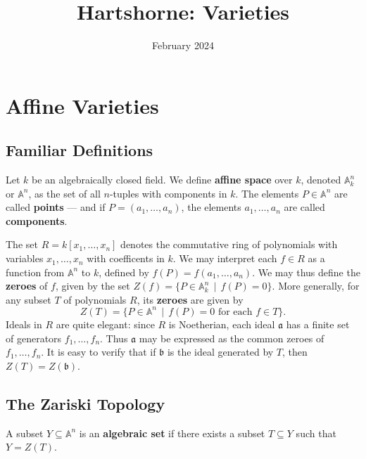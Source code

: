 \documentclass[11pt]{article}
\title{Hartshorne: Varieties}
\author{February 2024}
\begin{document}
\maketitle
\tableofcontents
\newpage


\section{Affine Varieties}


\subsection{Familiar Definitions}

Let $k$ be an algebraically closed field. We define \textbf{affine space} over $k$, denoted $\mathbb{A}_{k}^{n}$ or $\mathbb{A}^{n}$, as the set of all $n$-tuples with components in $k$. The elements $P \in \mathbb{A}^{n}$ are called \textbf{points} --- and if $P = (a_{1}, \ldots, a_{n})$, the elements $a_{1}, \ldots, a_{n}$ are called \textbf{components}.

The set $R = k[x_{1}, \ldots, x_{n}]$ denotes the commutative ring of polynomials with variables $x_{1}, \ldots, x_{n}$ with coefficents in $k$. We may interpret each $f \in R$ as a function from $\mathbb{A}^{n}$ to $k$, defined by $f(P) = f(a_{1}, \ldots, a_{n})$. We may thus define the \textbf{zeroes} of $f$, given by the set $Z(f) = \{ P \in \mathbb{A}_{k}^{n} \, \mid \, f(P) = 0 \}$. More generally, for any subset $T$ of polynomials $R$, its \textbf{zeroes} are given by
\[
  Z(T) = \{ P \in \mathbb{A}^{n} \, \mid \, f(P) = 0 \text{ for each } f \in T \}.
\]
Ideals in $R$ are quite elegant: since $R$ is Noetherian, each ideal $\mathfrak{a}$ has a finite set of generators $f_{1}, \ldots, f_{n}$. Thus $\mathfrak{a}$ may be expressed as the common zeroes of $f_{1}, \ldots, f_{n}$. It is easy to verify that if $\mathfrak{b}$ is the ideal generated by $T$, then $Z(T) = Z(\mathfrak{b})$.


\subsection{The Zariski Topology}

A subset $Y \subseteq \mathbb{A}^{n}$ is an \textbf{algebraic set} if there exists a subset $T \subseteq Y$ such that $Y = Z(T)$.
\end{document}
